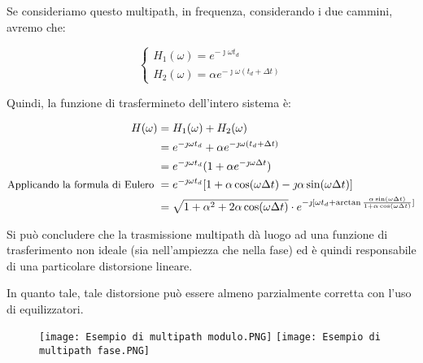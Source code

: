 Se consideriamo questo multipath, in frequenza, considerando i due cammini, avremo che: 

{
    \Large 
    \begin{equation}
        \begin{cases}
            H_1 (\omega) = e^{-\jmath \omega t_d} \\ 
            H_2 (\omega) = \alpha e^{-\jmath \omega (t_d + \Delta t)} 
        \end{cases}
    \end{equation}
} 

Quindi, la funzione di trasfermineto dell'intero sistema è: 

{
    \Large 
    \begin{equation}
        \begin{split}
            H(\omega) 
            &= 
            H_1 (\omega) + H_2 (\omega) 
            \\ 
            &= 
            e^{-\jmath \omega t_d} +  \alpha e^{-\jmath \omega (t_d + \Delta t)} 
            \\ 
            &= 
            e^{-\jmath \omega t_d} (1 + \alpha e^{-\jmath \omega \Delta t}) 
            \\
            {
                \small
                \text{Applicando la formula di Eulero }
            }
            &= 
            e^{-\jmath \omega t_d} 
            [1 + \alpha \cos(\omega \Delta t) - \jmath \alpha \sin(\omega \Delta t)] 
            \\ 
            &= 
            \sqrt{1 + \alpha ^{2} + 2 \alpha \cos(\omega \Delta t)} 
            \cdot 
            e^{-\jmath [\omega t_d + \arctan \frac{\alpha \sin(\omega \Delta t)}{1 + \alpha \cos(\omega \Delta t)}]}
        \end{split}
    \end{equation}
}

Si può concludere che la trasmissione multipath dà luogo ad una funzione di trasferimento non ideale (sia nell'ampiezza che nella fase) 
ed è quindi responsabile di una particolare distorsione lineare. \newline 

In quanto tale, tale distorsione può essere almeno parzialmente corretta con l'uso di equilizzatori. \newline 

{
    \begin{figure}[h]
        \centering
        \texttt{[image: Esempio di multipath modulo.PNG]}
        \texttt{[image: Esempio di multipath fase.PNG]}  
    \end{figure}  
     
} 
\newpage 

